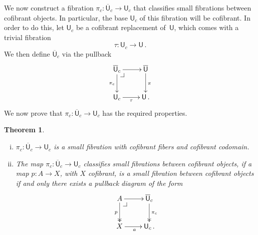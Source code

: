 \documentclass[reqno,10pt,a4paper,oneside,draft]{amsart}
\makeatletter
\numberwithin{equation}{section}
\theoremstyle{mythm}
\newtheorem{theorem}{Theorem}[section]
\theoremstyle{mydef}
\theoremstyle{myrmk}
\newcommand{\pullback}[1]{\save*!/#1-1.2pc/#1:(-1,1)@^{|-}\restore}
\newcommand{\drpullback}{\pullback{dr}}
\newcommand{\ie}{\text{i.e.\ }}
\newcommand{\co}{\colon}
\newcommand{\UU}{\overline{\mathsf{U}}}
\newcommand{\U}{\mathsf{U}}
\makeatother
\begin{document}
\bigskip

We now  construct a fibration $\pi_c \co \UU_c \to \U_c$ that classifies small fibrations between 
cofibrant objects. In particular, the base $\U_c$ of this fibration will be cofibrant.  In order to do this, let $\U_c$ be a cofibrant replacement of~$\U$,  which comes with a trivial fibration
\begin{equation}
\label{equ:ucu}
\tau \co \U_c \rightarrow \U \, .
\end{equation}
We then define $\UU_c$ via the pullback
\begin{equation}
\label{equ:def-of-pi-c}
\begin{gathered}
\xymatrix{
\UU_c \ar[d]_{\pi_c} \ar[r] \drpullback & \UU \ar[d]^{\pi}  \\
\U_c \ar[r]_\tau & \U \, .}
\end{gathered}
\end{equation}
We now prove that $\pi_c \co \UU_c \to \U_c$ has the required properties.

\begin{theorem} \label{thm:universe-uc} 
\hfill 
\begin{enumerate}[(i)] 
\item $\pi_c \co \UU_c \to \U_c$ is a small fibration with cofibrant fibers and cofibrant codomain. 
\item The map $\pi_c \co \UU_c \to \U_c$ classifies small fibrations between cofibrant
objects, \ie if a map $p \co A \to X$, with $X$ cofibrant, is a small fibration between cofibrant objects
if and only there exists a pullback diagram of the form
\[
\xymatrix{
A \ar[r] \ar@{->>}[d]_p \drpullback & \UU_c \ar@{->>}[d]^{\pi_c} \\
X \ar[r]_a & \U_c \, . }
\]
\end{enumerate}
\end{theorem}
\end{document}
